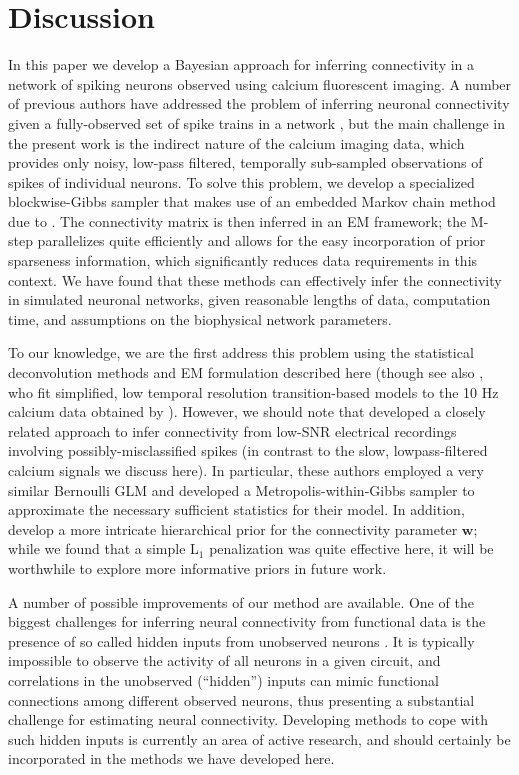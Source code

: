 \documentclass[aoas,preprint]{imsart}
\newcommand{\w}{w}
\newcommand{\bw}{\mathbf{\w}}
\begin{document}
\section{Discussion}
\label{sec:discussion}
In this paper we develop a Bayesian approach for inferring
connectivity in a network of spiking neurons observed using calcium
fluorescent imaging.  A number of previous authors have addressed the
problem of inferring neuronal connectivity given a fully-observed set
of spike trains in a network
\cite{BRIL88,CSK88,BRIL92,PAN03d,PAN04c,TRUC05,Rigat06,NYK06,KP06,Vidne08,Stevenson2009,Garofalo09},
but the main challenge in the present work is the indirect nature of
the calcium imaging data, which provides only noisy, low-pass
filtered, temporally sub-sampled observations of spikes of individual
neurons.  To solve this problem, we develop a specialized
blockwise-Gibbs sampler that makes use of an embedded Markov chain
method due to \cite{NBR03}.  The connectivity matrix is then inferred
in an EM framework; the M-step parallelizes quite efficiently and
allows for the easy incorporation of prior sparseness information,
which significantly reduces data requirements in this context.  We
have found that these methods can effectively infer the connectivity
in simulated neuronal networks, given reasonable lengths of data,
computation time, and assumptions on the biophysical network
parameters.

To our knowledge, we are the first address this problem using the
statistical deconvolution methods and EM formulation described here
(though see also \cite{Roxin08}, who fit simplified, low temporal
resolution transition-based models to the 10 Hz calcium data obtained
by \cite{IkegayaYuste04}).  However, we should note that
\cite{Rigat06} developed a closely related approach to infer
connectivity from low-SNR electrical recordings involving
possibly-misclassified spikes (in contrast to the slow,
lowpass-filtered calcium signals we discuss here).  In particular,
these authors employed a very similar Bernoulli GLM and developed a
Metropolis-within-Gibbs sampler to approximate the necessary
sufficient statistics for their model.  In addition, \cite{Rigat06}
develop a more intricate hierarchical prior for the connectivity
parameter $\bw$; while we found that a simple L$_1$ penalization was
quite effective here, it will be worthwhile to explore more
informative priors in future work.

A number of possible improvements of our method are available.  One of
the biggest challenges for inferring neural connectivity from
functional data is the presence of so called hidden inputs from
unobserved neurons \cite{Nykamp05,NYK06,KP06,Vidne08,Vakorin09}.  It
is typically impossible to observe the activity of all neurons in a
given circuit, and correlations in the unobserved (``hidden'') inputs
can mimic functional connections among different observed neurons,
thus presenting a substantial challenge for estimating neural
connectivity.  Developing methods to cope with such hidden inputs is
currently an area of active research, and should certainly be
incorporated in the methods we have developed here.
\end{document}
